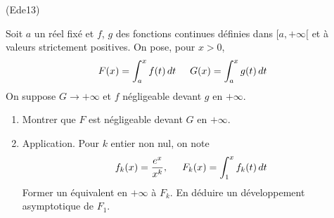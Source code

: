 \begin{tiny}(Ede13)\end{tiny} Soit $a$ un réel fixé et $f$, $g$ des fonctions continues définies dans $[a,+\infty[$ et à valeurs strictement positives. On pose, pour $x>0$,
\begin{displaymath}
 F(x) = \int_a^xf(t)\,dt \hspace{0.5cm} G(x) = \int_a^xg(t)\,dt
\end{displaymath}
On suppose $G\rightarrow +\infty$ et $f$ négligeable devant $g$ en $+\infty$.
\begin{enumerate}
 \item Montrer que $F$ est négligeable devant $G$ en $+\infty$.
 \item Application. Pour $k$ entier non nul, on note 
\begin{displaymath}
f_k(x)=\frac{e^x}{x^k},\hspace{.5cm}F_k(x)=\int_1^xf_k(t)\,dt 
\end{displaymath}
Former un équivalent en $+\infty$ à $F_k$. En déduire  un développement asymptotique de $F_1$.

\end{enumerate}
